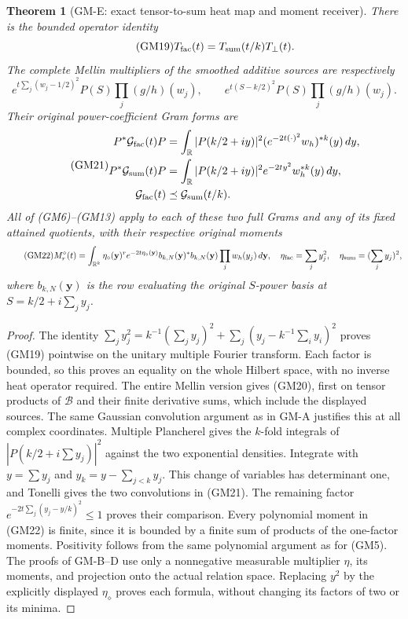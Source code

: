 \documentclass[11pt]{article}
\newtheorem{theorem}{Theorem}
\theoremstyle{remark}\newtheorem{remark}[theorem]{Remark}
\begin{document}
\begin{theorem}[GM-E: exact tensor-to-sum heat map and moment receiver]
There is the bounded operator identity
\begin{equation}\tag{GM19}
 T_{\rm fac}(t)=T_{\rm sum}(t/k)T_{\perp}(t).
\end{equation}
The complete Mellin multipliers of the smoothed additive sources are
respectively
\begin{equation}\tag{GM20}
 e^{t\sum_j(w_j-1/2)^2}P(S)\prod_j(g/h)(w_j),\qquad
 e^{t(S-k/2)^2}P(S)\prod_j(g/h)(w_j).
\end{equation}
Their original power-coefficient Gram forms are
\begin{equation}\tag{GM21}
 \begin{split}
 P^*\mathcal G_{\rm fac}(t)P
 &=\int_{\mathbb R}|P(k/2+iy)|^2
               (e^{-2t(\cdot)^2}w_h)^{*k}(y)\,dy,\\
 P^*\mathcal G_{\rm sum}(t)P
 &=\int_{\mathbb R}|P(k/2+iy)|^2
                 e^{-2ty^2}w_h^{*k}(y)\,dy,\\
 \mathcal G_{\rm fac}(t)&\preceq\mathcal G_{\rm sum}(t/k).
 \end{split}
\end{equation}
All of (GM6)--(GM13) apply to each of these two full Grams and any
of its fixed attained quotients, with their respective original
moments
\begin{equation}\tag{GM22}
 M_r^\diamond(t)=\int_{\mathbb R^k}
   \eta_\diamond(\mathbf y)^r e^{-2t\eta_\diamond(\mathbf y)}
   b_{k,N}(\mathbf y)^*b_{k,N}(\mathbf y)
                          \prod_jw_h(y_j)\,d\mathbf y,
 \quad
 \eta_{\rm fac}=\sum_jy_j^2,\quad
 \eta_{\rm sum}=(\sum_jy_j)^2,
\end{equation}
where $b_{k,N}(\mathbf y)$ is the row evaluating the original
$S$-power basis at $S=k/2+i\sum_jy_j$.
\end{theorem}
\begin{proof}
The identity
$\sum_jy_j^2=k^{-1}(\sum_jy_j)^2+
\sum_j(y_j-k^{-1}\sum_i y_i)^2$ proves (GM19) pointwise on the
unitary multiple Fourier transform.  Each factor is bounded, so this
proves an equality on the whole Hilbert space, with no inverse heat
operator required.  The entire Mellin version gives (GM20), first on
tensor products of $\mathscr B$ and their finite derivative sums,
which include the displayed sources.  The same Gaussian convolution
argument as in GM-A justifies this at all complex coordinates.
Multiple Plancherel gives the $k$-fold integrals of
$|P(k/2+i\sum y_j)|^2$ against the two exponential densities.
Integrate with $y=\sum y_j$ and
$y_k=y-\sum_{j<k}y_j$.  This change of variables has determinant
one, and Tonelli gives the two convolutions in (GM21).  The remaining
factor $e^{-2t\sum_j(y_j-y/k)^2}\leq1$ proves their comparison.
Every polynomial moment in (GM22) is finite, since it is bounded by
a finite sum of products of the one-factor moments.  Positivity
follows from the same polynomial argument as for (GM5).
The proofs of GM-B--D use only a nonnegative measurable multiplier
$\eta$, its moments, and projection onto the actual relation space.
Replacing $y^2$ by the explicitly displayed $\eta_\diamond$ proves
each formula, without changing its factors of two or its minima.
\end{proof}
\end{document}
